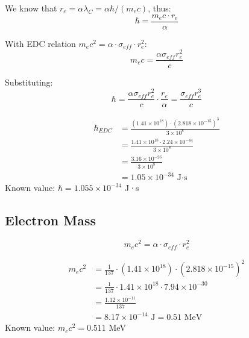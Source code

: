 \documentclass[12pt,a4paper]{article}
\begin{document}
We know that $r_e = \alpha \lambda_C = \alpha \hbar / (m_e c)$, thus:
\begin{equation}
\hbar = \frac{m_e c \cdot r_e}{\alpha}
\end{equation}

With EDC relation $m_e c^2 = \alpha \cdot \sigma_{eff} \cdot r_e^2$:
\begin{equation}
m_e c = \frac{\alpha \sigma_{eff} r_e^2}{c}
\end{equation}

Substituting:
\begin{equation}
\hbar = \frac{\alpha \sigma_{eff} r_e^2}{c} \cdot \frac{r_e}{\alpha} = \frac{\sigma_{eff} r_e^3}{c}
\end{equation}

\begin{numericalcheck}
\begin{align*}
\hbar_{EDC} &= \frac{(1.41 \times 10^{18}) \cdot (2.818 \times 10^{-15})^3}{3 \times 10^8} \\
&= \frac{1.41 \times 10^{18} \cdot 2.24 \times 10^{-44}}{3 \times 10^8} \\
&= \frac{3.16 \times 10^{-26}}{3 \times 10^8} \\
&= 1.05 \times 10^{-34} \text{ J·s}
\end{align*}
Known value: $\hbar = 1.055 \times 10^{-34}$ J·s \checkmark
\end{numericalcheck}

\subsection{Electron Mass}

\begin{keyresult}
\begin{equation}
\boxed{m_e c^2 = \alpha \cdot \sigma_{eff} \cdot r_e^2}
\end{equation}
\end{keyresult}

\begin{numericalcheck}
\begin{align*}
m_e c^2 &= \frac{1}{137} \cdot (1.41 \times 10^{18}) \cdot (2.818 \times 10^{-15})^2 \\
&= \frac{1}{137} \cdot 1.41 \times 10^{18} \cdot 7.94 \times 10^{-30} \\
&= \frac{1.12 \times 10^{-11}}{137} \\
&= 8.17 \times 10^{-14} \text{ J} = 0.51 \text{ MeV}
\end{align*}
Known value: $m_e c^2 = 0.511$ MeV \checkmark
\end{numericalcheck}
\end{document}
